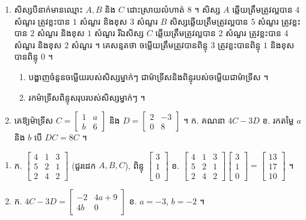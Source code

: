 \begin{pro}
\begin{enumerate}[1]
  \item សិស្សបីនាក់មានឈ្មោះ $A, B$ និង $C$ ដោះស្រាយលំហាត់ $8$ ។ សិស្ស $A$ ឆ្លើយត្រឹមត្រូវល្អបាន $4$ សំណួរ ត្រូវខ្លះបាន $1$ សំណួរ និងខុស $3$ សំណួរ $B$ សិស្សឆ្លើយត្រឹមត្រូវល្អបាន $5$ សំណួរ ត្រូវខ្លះបាន $2$ សំណួរ និងខុស $1$ សំណួរ រីឯសិស្ស $C$ ឆ្លើយត្រឹមត្រូវល្អបាន $2$ សំណួរ ត្រូវខ្លះបាន $4$ សំណួរ និងខុស $2$ សំណួរ ។ គេសន្មតថា ចម្លើយត្រឹមត្រូវបានពិន្ទុ $3$ ត្រូវខ្លះបានពិន្ទុ $1$ និងខុសបានពិន្ទុ $0$ ។
  \begin{enumerate}[a]
    \item បង្ហាញចំនួនចម្លើយរបស់សិស្សម្នាក់ៗ ជាម៉ាទ្រីសនិងពិន្ទុរបស់ចម្លើយជាម៉ាទ្រីស ។
    \item រកម៉ាទ្រីសពិន្ទុសរុបរបស់សិស្សម្នាក់ៗ ។
  \end{enumerate}
  \item គេឱ្យម៉ាទ្រីស $C = \begin{bmatrix} 1 & a\\ b & 6 \end{bmatrix}$ និង $D = \begin{bmatrix} 2 & -3\\ 0 & 8 \end{bmatrix}$ ។ \quad ក. គណនា $4C - 3D$ \quad ខ. រកតម្លៃ $a$ និង $b$ បើ $DC = 8C$ ។
\end{enumerate}
\ans
\begin{enumerate}[1]
  \item ក. $\begin{bmatrix} 4 & 1 & 3\\ 5 & 2 & 1\\ 2 & 4 & 2 \end{bmatrix}$ (ជួរដេក $A, B, C$), ពិន្ទុ $\begin{bmatrix} 3\\ 1\\ 0 \end{bmatrix}$ \quad ខ. $\begin{bmatrix} 4 & 1 & 3\\ 5 & 2 & 1\\ 2 & 4 & 2 \end{bmatrix}\begin{bmatrix} 3\\ 1\\ 0 \end{bmatrix} = \begin{bmatrix} 13\\ 17\\ 10 \end{bmatrix}$ ។
  \item ក. $4C - 3D = \begin{bmatrix} -2 & 4a + 9\\ 4b & 0 \end{bmatrix}$ \quad ខ. $a = -3$, $b = -2$ ។
\end{enumerate}
\end{pro}

